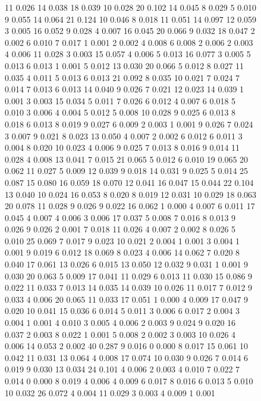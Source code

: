\begin{figure}[htbp]
11 0.026  14 0.038  18 0.039  10 0.028  20 0.102  
14 0.045  8 0.029  5 0.010  9 0.055  14 0.064  
21 0.124  10 0.046  8 0.018  11 0.051  14 0.097  
12 0.059  3 0.005  16 0.052  9 0.028  4 0.007  
16 0.045  20 0.066  9 0.032  18 0.047  2 0.002  
6 0.010  7 0.017  1 0.001  2 0.002  4 0.008  
6 0.008  2 0.006  2 0.003  4 0.006  11 0.028  
3 0.003  15 0.057  4 0.006  5 0.013  16 0.077  
3 0.005  5 0.013  6 0.013  1 0.001  5 0.012  
13 0.030  20 0.066  5 0.012  8 0.027  11 0.035  
4 0.011  5 0.013  6 0.013  21 0.092  8 0.035  
10 0.021  7 0.024  7 0.014  7 0.013  6 0.013  
14 0.040  9 0.026  7 0.021  12 0.023  14 0.039  
1 0.001  3 0.003  15 0.034  5 0.011  7 0.026  
6 0.012  4 0.007  6 0.018  5 0.010  3 0.006  
4 0.004  5 0.012  5 0.008  10 0.028  9 0.025  
6 0.013  8 0.018  6 0.013  8 0.019  9 0.027  
6 0.009  2 0.003  1 0.001  9 0.026  7 0.024  
3 0.007  9 0.021  8 0.023  13 0.050  4 0.007  
2 0.002  6 0.012  6 0.011  3 0.004  8 0.020  
10 0.023  4 0.006  9 0.025  7 0.013  8 0.016  
9 0.014  11 0.028  4 0.008  13 0.041  7 0.015  
21 0.065  5 0.012  6 0.010  19 0.065  20 0.062  
11 0.027  5 0.009  12 0.039  9 0.018  14 0.031  
9 0.025  5 0.014  25 0.087  15 0.080  16 0.059  
18 0.070  12 0.041  16 0.047  15 0.044  22 0.104  
13 0.040  10 0.024  16 0.053  8 0.020  8 0.019  
12 0.031  10 0.029  18 0.063  20 0.078  11 0.028  
9 0.026  9 0.022  16 0.062  1 0.000  4 0.007  
6 0.011  17 0.045  4 0.007  4 0.006  3 0.006  
17 0.037  5 0.008  7 0.016  8 0.013  9 0.026  
9 0.026  2 0.001  7 0.018  11 0.026  4 0.007  
2 0.002  8 0.026  5 0.010  25 0.069  7 0.017  
9 0.023  10 0.021  2 0.004  1 0.001  3 0.004  
1 0.001  9 0.019  6 0.012  18 0.069  8 0.023  
4 0.006  14 0.062  7 0.020  8 0.040  17 0.061  
13 0.026  6 0.015  13 0.050  12 0.032  9 0.031  
1 0.001  9 0.030  20 0.063  5 0.009  17 0.041  
11 0.029  6 0.013  11 0.030  15 0.086  9 0.022  
11 0.033  7 0.013  14 0.035  14 0.039  10 0.026  
11 0.017  7 0.012  9 0.033  4 0.006  20 0.065  
11 0.033  17 0.051  1 0.000  4 0.009  17 0.047  
9 0.020  10 0.041  15 0.036  6 0.014  5 0.011  
3 0.006  6 0.017  2 0.004  3 0.004  1 0.001  
4 0.010  3 0.005  4 0.006  2 0.003  9 0.024  
9 0.020  16 0.037  2 0.003  8 0.022  1 0.001  
5 0.008  2 0.002  3 0.003  10 0.026  
4 0.006  14 0.053  2 0.002  40 0.287  9 0.016  
0 0.000  8 0.017  15 0.061  10 0.042  11 0.031  
13 0.064  4 0.008  17 0.074  10 0.030  9 0.026  
7 0.014  6 0.019  9 0.030  13 0.034  24 0.101  
4 0.006  2 0.003  4 0.010  7 0.022  7 0.014  
0 0.000  8 0.019  4 0.006  4 0.009  6 0.017  
8 0.016  6 0.013  5 0.010  10 0.032  26 0.072  
4 0.004  11 0.029  3 0.003  4 0.009  1 0.001  

\end{figure}
